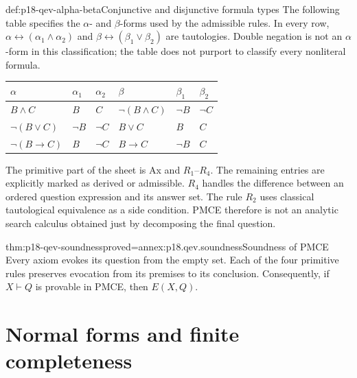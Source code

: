\begin{hbdefinition}{def:p18-qev-alpha-beta}{Conjunctive and disjunctive formula types}
The following table specifies the \(\alpha\)- and \(\beta\)-forms
used by the admissible rules. In every row,
\(\alpha\leftrightarrow(\alpha_1\land\alpha_2)\) and
\(\beta\leftrightarrow(\beta_1\lor\beta_2)\) are tautologies.
Double negation is not an \(\alpha\)-form in this classification;
the table does not purport to classify every nonliteral formula.
\begin{center}
\begin{tabular}{lll|lll}
\(\alpha\)&\(\alpha_1\)&\(\alpha_2\)&
\(\beta\)&\(\beta_1\)&\(\beta_2\)\\
\hline
\(B\land C\)&\(B\)&\(C\)&\(\neg(B\land C)\)&\(\neg B\)&\(\neg C\)\\
\(\neg(B\lor C)\)&\(\neg B\)&\(\neg C\)&\(B\lor C\)&\(B\)&\(C\)\\
\(\neg(B\to C)\)&\(B\)&\(\neg C\)&\(B\to C\)&\(\neg B\)&\(C\)
\end{tabular}
\end{center}
\end{hbdefinition}


The primitive part of the sheet is Ax and \(R_1\)--\(R_4\).
The remaining entries are explicitly marked as derived or admissible.
\(R_4\) handles the difference between an ordered question expression
and its answer set. The rule \(R_2\) uses classical tautological
equivalence as a side condition. PMCE therefore is not an analytic
search calculus obtained just by decomposing the final question.

\begin{hbtheorem}{thm:p18-qev-soundness}{proved=annex:p18.qev.soundness}{Soundness of PMCE}
Every axiom evokes its question from the empty set. Each of the four
primitive rules preserves evocation from its premises to its conclusion.
Consequently, if \(X\vdash Q\) is provable in PMCE, then \(E(X,Q)\).
\end{hbtheorem}

\section{Normal forms and finite completeness}

